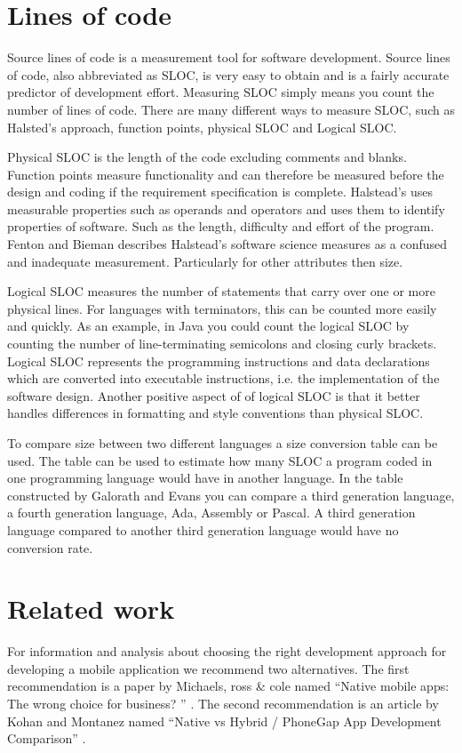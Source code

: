 \section{Lines of code}\label{sec:lines-of-code}
Source lines of code is a measurement tool for software development. Source lines of code, also abbreviated as SLOC, is very easy to obtain and is a fairly accurate predictor of development effort\cite[p.~63]{galorath2006}. Measuring SLOC simply means you count the number of lines of code. There are many different ways to measure SLOC, such as Halsted’s approach, function points, physical SLOC and Logical SLOC. 

Physical SLOC is the length of the code excluding comments and blanks. Function points measure functionality and can therefore be measured before the design and coding if the requirement specification is complete\cite[p.~187]{galorath2006}. Halstead’s uses measurable properties such as operands and operators and uses them to identify properties of software. Such as the length, difficulty and effort of the program. Fenton and Bieman describes Halstead’s software science measures as a confused and inadequate measurement. Particularly for other attributes then size\cite[p.~345]{fenton2015}.

Logical SLOC measures the number of statements that carry over one or more physical lines.  For languages with terminators, this can be counted more easily and quickly. As an example, in Java you could count the logical SLOC by counting the number of line-terminating semicolons and closing curly brackets. Logical SLOC represents the programming instructions and data declarations which are converted into executable instructions, i.e. the implementation of the software design. Another positive aspect of of logical SLOC is that it better handles differences in formatting and style conventions than physical SLOC\cite[p.~155]{galorath2006}.

To compare size between two different languages a size conversion table can be used. The table can be used to estimate how many SLOC a program coded in one programming language would have in another language. In the table constructed by Galorath and Evans you can compare a third generation language, a fourth generation language, Ada, Assembly or Pascal\cite[p.~163]{galorath2006}. A third generation language compared to another third generation language would have no conversion rate. 

\section{Related work}\label{sec:further-reading}
For information and analysis about choosing the right development approach for developing a mobile application we recommend two alternatives. The first recommendation is a paper by Michaels, ross \& cole named “Native mobile apps: The wrong choice for business? ” \cite{michaels2013}. The second recommendation is an article by Kohan and Montanez named “Native vs Hybrid / PhoneGap App Development Comparison” \cite{kohan2015}. 

